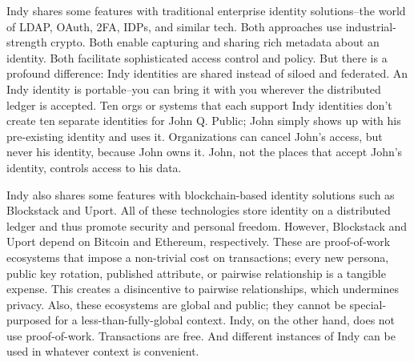 Indy shares some features with traditional enterprise identity solutions--the world of LDAP, OAuth, 2FA, IDPs, and similar tech. Both approaches use industrial-strength crypto. Both enable capturing and sharing rich metadata about an identity. Both facilitate sophisticated access control and policy. But there is a profound difference: Indy identities are shared instead of siloed and federated. An Indy identity is portable--you can bring it with you wherever the distributed ledger is accepted. Ten orgs or systems that each support Indy identities don't create ten separate identities for John Q. Public; John simply shows up with his pre-existing identity and uses it. Organizations can cancel John's access, but never his identity, because John owns it. John, not the places that accept John's identity, controls access to his data.

Indy also shares some features with blockchain-based identity solutions such as Blockstack and Uport. All of these technologies store identity on a distributed ledger and thus promote security and personal freedom. However, Blockstack and Uport depend on Bitcoin and Ethereum, respectively. These are proof-of-work ecosystems that impose a non-trivial cost on transactions; every new persona, public key rotation, published attribute, or pairwise relationship is a tangible expense. This creates a disincentive to pairwise relationships, which undermines privacy. Also, these ecosystems are global and public; they cannot be special-purposed for a less-than-fully-global context. Indy, on the other hand, does not use proof-of-work. Transactions are free. And different instances of Indy can be used in whatever context is convenient.
